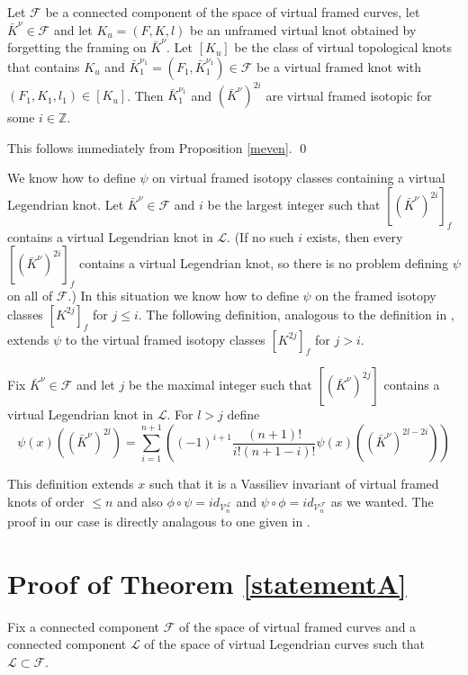 \begin{prop} \label{conncomp}  Let $\mathcal{F}$ be a connected component of the space of virtual framed curves, let $\bar{K}^\nu \in \mathcal{F}$ and let $K_u=(F,K,l)$ be an unframed virtual knot obtained by forgetting the framing on $\bar{K}^\nu$. Let $[K_u]$ be the class of virtual topological knots that contains $K_u$ and $\bar{K}_1^{\nu_1} = (F_1, \bar{K}_1^{\nu_1})\in \mathcal{F}$ be a virtual framed knot with $(F_1, K_1, l_1)\in [K_u]$.  Then $\bar{K}_1^{\nu_1}$ and $(\bar{K}^{\nu})^{2i}$ are virtual framed isotopic for some $i\in\mathbb{Z}$. 
\end{prop}
\pp This follows immediately from Proposition \ref{meven}.
\qed






We know how to define $\psi$ on virtual framed isotopy classes containing a virtual Legendrian knot. Let $\bar{K}^\nu \in \mathcal{F}$ and $i$ be the largest integer such that $[(\bar{K}^\nu)^{2i}]_f$ contains a virtual Legendrian knot in $\mathcal{L}$.  (If no such $i$ exists, then every $[(\bar{K}^\nu)^{2i}]_f$ contains a virtual Legendrian knot, so there is no problem defining $\psi$ on all of $\mathcal{F}$.) In this situation we know how to define $\psi$ on the framed isotopy classes $[K^{2j}]_f$ for $j\leq i$.  The following definition, analogous to the definition in \cite{Chernov}, extends $\psi$ to the virtual framed isotopy classes $[K^{2j}]_f$ for $j>i$. 

\begin{defin}
Fix $\bar{K}^\nu \in\mathcal{F}$ and let $j$ be the maximal integer such that $[(\bar{K}^\nu)^{2j}]$ contains a virtual Legendrian knot in $\mathcal{L}$.  For $l>j$ define 
$$\psi(x)((\bar{K}^\nu)^{2l}) = \sum_{i=1}^{n+1}\left( (-1)^{i+1} \frac{(n+1)!}{i!(n+1-i)!}\psi(x)((\bar{K}^\nu)^{2l-2i}) \right)$$
\end{defin}

This definition extends $x$ such that it is a Vassiliev invariant of virtual framed knots of order $\leq n$ and also $\phi \circ \psi = id_{\mathcal{V}_n^\mathcal{L}}$  and $\psi \circ \phi = id_{\mathcal{V}_n^\mathcal{F}}$ as we wanted.  The proof in our case is directly analagous to one given in \cite{Chernov}.


\section{Proof of Theorem \ref{statementA}}
Fix a connected component $\mathcal{F}$ of the space of virtual framed curves and a connected component $\mathcal{L}$ of the space of virtual Legendrian curves such that $\mathcal{L}\subset \mathcal{F}$.

